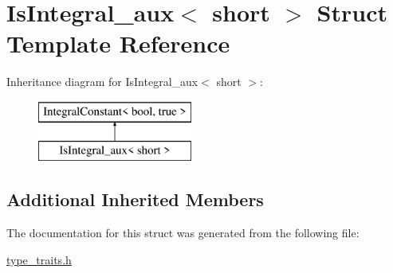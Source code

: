 \hypertarget{struct_is_integral__aux_3_01short_01_4}{}\section{Is\+Integral\+\_\+aux$<$ short $>$ Struct Template Reference}
\label{struct_is_integral__aux_3_01short_01_4}
Inheritance diagram for Is\+Integral\+\_\+aux$<$ short $>$\+:\begin{figure}[H]
\begin{center}
\leavevmode
\includegraphics[height=2.000000cm]{struct_is_integral__aux_3_01short_01_4}
\end{center}
\end{figure}
\subsection*{Additional Inherited Members}


The documentation for this struct was generated from the following file\+:\begin{DoxyCompactItemize}
\item 
\hyperlink{type__traits_8h}{type\+\_\+traits.\+h}\end{DoxyCompactItemize}
